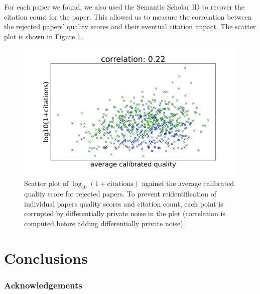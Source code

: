\documentclass[twoside]{article}
\begin{document}
For each paper we found, we also used the Semantic Scholar ID to recover the citation count for the paper. This allowed us to measure the correlation between the rejected papers' quality scores and their eventual citation impact. The scatter plot is shown in Figure \ref{figure-citations-vs-average-calibrated-quality-reject}.

\begin{figure}[htb]
\includegraphics[width=0.90\columnwidth]{diagrams/neurips/citations-vs-average-calibrated-quality-reject.pdf}

\caption{Scatter plot of $\log_{10}(1+\text{citations})$ against the average calibrated quality score for rejected papers. To prevent reidentification of individual papers quality scores and citation count, each point is corrupted by differentially private noise in the plot (correlation is computed before adding differentially private noise).}
\label{figure-citations-vs-average-calibrated-quality-reject}
\end{figure}

\section{Conclusions}

\subsubsection*{Acknowledgements}




\appendix

\onecolumn
{}


\vfill
\end{document}

